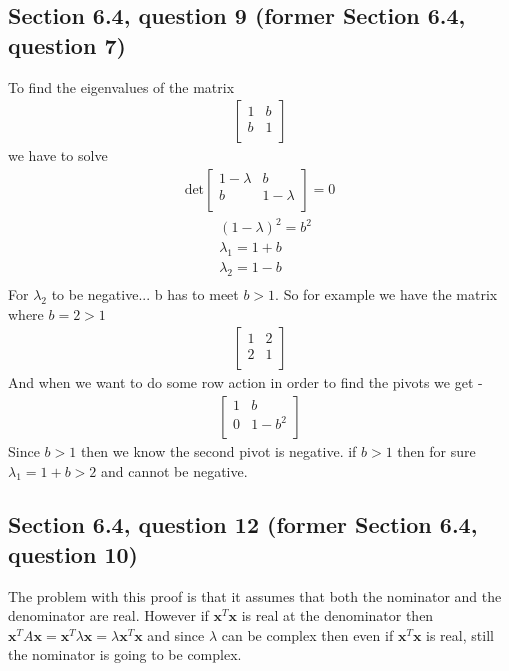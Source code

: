 \documentclass[a4paper,11pt]{article}
\newcommand{\mybf}[1]{\boldsymbol{#1}}
\begin{document}
\subsection*{Section 6.4, question 9 (former Section 6.4, question 7)}
To find the eigenvalues of the matrix 
\begin{align*}
\begin{bmatrix}
1 & b \\
b & 1 \\
\end{bmatrix}
\end{align*}
we have to solve
\begin{align*}
\text{det}
\begin{bmatrix}
1-\lambda & b \\
b & 1-\lambda \\
\end{bmatrix} = 0
\end{align*}
\begin{align*}
&(1-\lambda)^2=b^2 \\
&\lambda_1 = 1 + b \\
&\lambda_2 = 1 - b\\
\end{align*}
For $\lambda_2$ to be negative... b has to meet $b>1$.
So for example we have the matrix where $b=2>1$
\begin{align*}
\begin{bmatrix}
1 & 2 \\
2 & 1 \\
\end{bmatrix}
\end{align*}
And when we want to do some row action in order  to find the pivots we get - 
\begin{align*}
\begin{bmatrix}
1 & b \\
0 & 1-b^2 \\
\end{bmatrix}
\end{align*}
Since $b>1$ then we know the second pivot is negative.
if $b>1$ then for sure $\lambda_1 = 1 + b > 2$ and cannot be negative. 
\subsection*{Section 6.4, question 12 (former Section 6.4, question 10)}
The problem with this proof is that it assumes that both the nominator and the denominator are real. However if $\mybf{x}^T\mybf{x}$ is real at the denominator then $\mybf{x}^T{A}\mybf{x}=\mybf{x}^T{\lambda}\mybf{x}=\lambda{\mybf{x}^T}\mybf{x}$ and since $\lambda$ can be complex then even if ${\mybf{x}^T}\mybf{x}$ is real, still the nominator is going to be complex.
\end{document}
